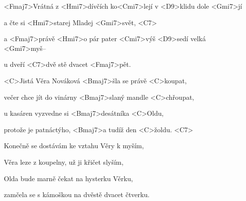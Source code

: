 

\zr
<Fmaj7>Vrátná z <Hmi7>dívčích ko<Cmi7>lejí v <D9>klidu 
dole <Gmi7>jí

a čte si <Hmi7>starej Mladej <Gmi7>svět, <C7>

a <Fmaj7>právě <Hmi7>o pár pater <Cmi7>výš <D9>sedí velká <Gmi7>myš--

u dveří <C7>dvě stě dvacet <Fmaj7>pět.
\kr

\zs
<C>Jistá Věra Nováková <Bmaj7>šla se právě <C>koupat,

večer chce jít do vinárny <Bmaj7>slaný mandle <C>chřoupat,

u kasáren vyzvedne si <Bmaj7>desátníka <C>Oldu,

protože je patnáctýho, <Bmaj7>a tudíž den <C>žoldu. <C7>
\ks

\zr \kr

\zs
Konečně se dostávám ke vztahu Věry k myším,

Věra leze z koupelny, už ji křičet slyším,

Olda bude marně čekat na hysterku Věrku,

zamčela se s kámoškou na dvěstě dvacet čtverku.
\ks

\zr \kr

\kp

